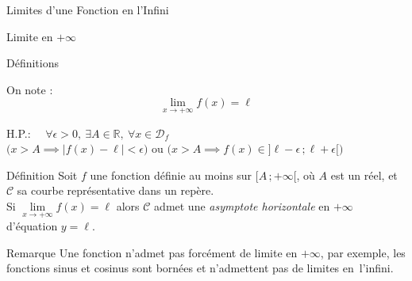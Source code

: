 \documentclass{cours}
\begin{document}
\begin{Gpartie}{Limites d'une Fonction en l'Infini}
\begin{Spartie}{Limite en $+\infty$}
\begin{SSpartie}{Définitions}
\begin{itemize}
                    On note : \[\boxed{\lim\limits_{x\to +\infty}f(x)=\ell}\]
                    \begin{center}
                        \parbox{\linewidth}{}
                    \end{center}
                    \vspace*{2ex}
                    H.P.: $\quad\forall\epsilon >0,~\exists A\in\mathbb{R},~\forall x\in\mathcal{D}_f$ \\ \phantom{H.P.: \quad}$\bigg(x>A\implies\left\lvert f(x)-\ell\right\rvert <\epsilon\bigg)$ ou $\bigg(x>A\implies f(x)\in\big]\ell-\epsilon\,;\ell+\epsilon\big[\bigg)$
                \end{itemize}
            \end{SSpartie}
            \begin{SSpartie}{Définition} 
                Soit $f$ une fonction définie au moins sur $\big[A\,;+\infty\big[$, où $A$ est un réel, et $\mathcal{C}$ sa courbe représentative dans un repère. \\ Si $\lim\limits_{x\to+\infty}f(x)=\ell$ alors $\mathcal{C}$ admet une \emph{asymptote horizontale} en $+\infty$ \\ d'équation $y=\ell$.
            \end{SSpartie}
            \begin{SSpartie}{Remarque} 
                Une fonction n'admet pas forcément de limite en $+\infty$, par exemple, les fonctions sinus et cosinus sont bornées et n'admettent pas de limites en~l'infini.
            \end{SSpartie}
        \end{Spartie}

\end{Gpartie}
\end{document}
